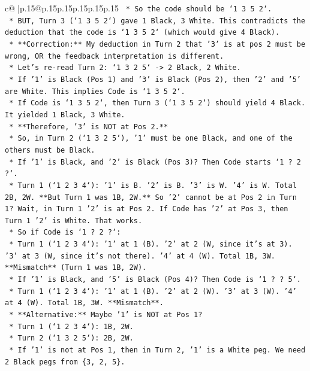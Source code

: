 \documentclass{article}
\begin{document}
{\begin{supertabular}{c@{$\;$}|p{.15\linewidth}@{}p{.15\linewidth}p{.15\linewidth}p{.15\linewidth}p{.15\linewidth}p{.15\linewidth}}
{{{\texttt{    *   So the code should be `1 3 5 2`.} \\
\texttt{    *   BUT, Turn 3 (`1 3 5 2`) gave 1 Black, 3 White. This contradicts the deduction that the code is `1 3 5 2` (which would give 4 Black).} \\
\texttt{    *   **Correction:** My deduction in Turn 2 that '3' is at pos 2 must be wrong, OR the feedback interpretation is different.} \\
\texttt{    *   Let's re{-}read Turn 2: `1 3 2 5` {-}> 2 Black, 2 White.} \\
\texttt{        *   If '1' is Black (Pos 1) and '3' is Black (Pos 2), then '2' and '5' are White. This implies Code is `1 3 5 2`.} \\
\texttt{        *   If Code is `1 3 5 2`, then Turn 3 (`1 3 5 2`) should yield 4 Black. It yielded 1 Black, 3 White.} \\
\texttt{        *   **Therefore, '3' is NOT at Pos 2.**} \\
\texttt{    *   So, in Turn 2 (`1 3 2 5`), '1' must be one Black, and one of the others must be Black.} \\
\texttt{        *   If '1' is Black, and '2' is Black (Pos 3)? Then Code starts `1 ? 2 ?`.} \\
\texttt{            *   Turn 1 (`1 2 3 4`): '1' is B. '2' is B. '3' is W. '4' is W. Total 2B, 2W. **But Turn 1 was 1B, 2W.** So '2' cannot be at Pos 2 in Turn 1? Wait, in Turn 1 '2' is at Pos 2. If Code has '2' at Pos 3, then Turn 1 '2' is White. That works.} \\
\texttt{            *   So if Code is `1 ? 2 ?`:} \\
\texttt{                *   Turn 1 (`1 2 3 4`): '1' at 1 (B). '2' at 2 (W, since it's at 3). '3' at 3 (W, since it's not there). '4' at 4 (W). Total 1B, 3W. **Mismatch** (Turn 1 was 1B, 2W).} \\
\texttt{        *   If '1' is Black, and '5' is Black (Pos 4)? Then Code is `1 ? ? 5`.} \\
\texttt{            *   Turn 1 (`1 2 3 4`): '1' at 1 (B). '2' at 2 (W). '3' at 3 (W). '4' at 4 (W). Total 1B, 3W. **Mismatch**.} \\
\texttt{    *   **Alternative:** Maybe '1' is NOT at Pos 1?} \\
\texttt{        *   Turn 1 (`1 2 3 4`): 1B, 2W.} \\
\texttt{        *   Turn 2 (`1 3 2 5`): 2B, 2W.} \\
\texttt{        *   If '1' is not at Pos 1, then in Turn 2, '1' is a White peg. We need 2 Black pegs from \{3, 2, 5\}.} \\
}}}
\end{supertabular}}
\end{document}
